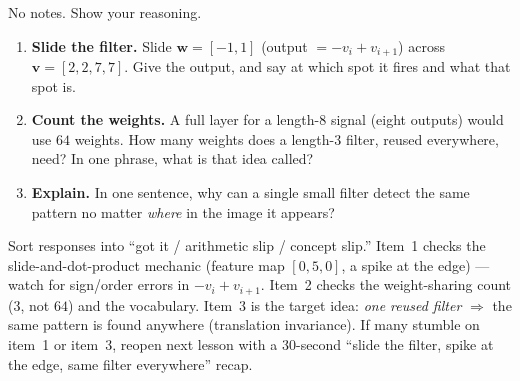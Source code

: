 \documentclass[10pt]{article}
\newcommand{\vv}{\mathbf{v}}
\newcommand{\ww}{\mathbf{w}}
\begin{document}
\namedateperiod

\vspace{0.15in}

No notes. Show your reasoning.

\begin{enumerate}[leftmargin=1.8em, itemsep=16pt]
  \item \textbf{Slide the filter.} Slide $\ww=[-1,1]$ (output $=-v_i+v_{i+1}$) across $\vv=[2,2,7,7]$.
        Give the output, and say at which spot it fires and what that spot is.
  \item \textbf{Count the weights.} A full layer for a length-$8$ signal (eight outputs) would use $64$
        weights. How many weights does a length-$3$ filter, reused everywhere, need? In one phrase, what is
        that idea called?
  \item \textbf{Explain.} In one sentence, why can a single small filter detect the same pattern no matter
        \emph{where} in the image it appears?
\end{enumerate}

\begin{teachernote}
Sort responses into ``got it / arithmetic slip / concept slip.'' Item~1 checks the slide-and-dot-product
mechanic (feature map $[0,5,0]$, a spike at the edge) --- watch for sign/order errors in $-v_i+v_{i+1}$.
Item~2 checks the weight-sharing count ($3$, not $64$) and the vocabulary. Item~3 is the target idea:
\emph{one reused filter} $\Rightarrow$ the same pattern is found anywhere (translation invariance). If many
stumble on item~1 or item~3, reopen next lesson with a 30-second ``slide the filter, spike at the edge, same
filter everywhere'' recap.
\end{teachernote}
\end{document}
